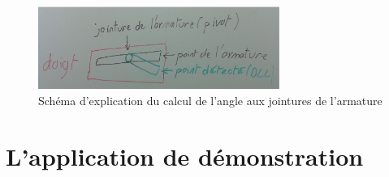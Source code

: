 \newpage

\begin{figure}[H]
 \centering
 \includegraphics[width=0.7\textwidth]{images/SchemaRotationDoigt.png}
 \caption{Schéma d'explication du calcul de l'angle aux jointures de l'armature}
\end{figure}

\section{L'application de démonstration}